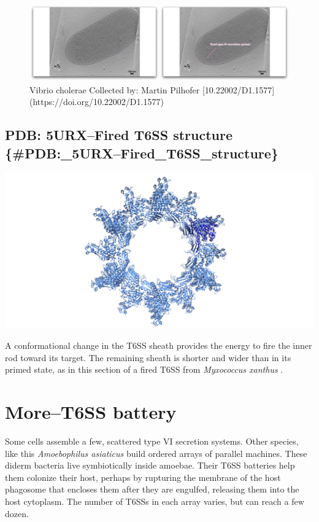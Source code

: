 \documentclass[]{tufte-book}
\begin{document}
\begin{figure}
\includegraphics{movie_stills/9_7} \caption[Vibrio cholerae Collected by]{Vibrio cholerae Collected by: Martin Pilhofer [10.22002/D1.1577](https://doi.org/10.22002/D1.1577)}\label{fig:unnamed-chunk-163}
\end{figure}

\subsection{PDB: 5URX--Fired T6SS structure
\{\#PDB:\_5URX--Fired\_T6SS\_structure\}}\label{pdb-5urxfired-t6ss-structure-pdb_5urxfired_t6ss_structure}

\includegraphics{img/schematics/9_7_1}

A conformational change in the T6SS sheath provides the energy to fire
the inner rod toward its target. The remaining sheath is shorter and
wider than in its primed state, as in this section of a fired T6SS from
\emph{Myxococcus xanthus} \citet{chang2017}.

\hypertarget{moret6ss-battery}{\section{More--T6SS
battery}\label{moret6ss-battery}}

Some cells assemble a few, scattered type VI secretion systems. Other
species, like this \emph{Amoebophilus asiaticus} build ordered arrays of
parallel machines. These diderm bacteria live symbiotically inside
amoebae. Their T6SS batteries help them colonize their host, perhaps by
rupturing the membrane of the host phagosome that encloses them after
they are engulfed, releasing them into the host cytoplasm. The number of
T6SSs in each array varies, but can reach a few dozen.
\end{document}
